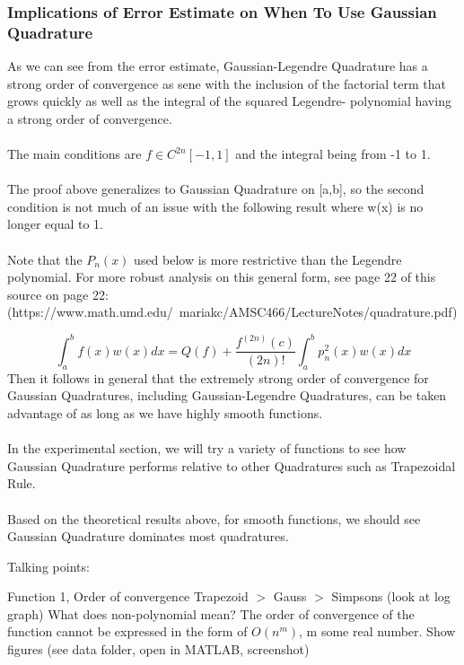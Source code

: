 \documentclass[12pt]{article}
\begin{document}
\subsubsection{Implications of Error Estimate on When To Use Gaussian Quadrature}
As we can see from the error estimate, Gaussian-Legendre Quadrature has a strong order of convergence as sene with the inclusion of the factorial term that grows quickly as well as the integral of the squared Legendre- polynomial having a strong order of convergence. 
\\
\\
The main conditions are $f \in C^{2n}[-1,1]$ and the integral being from -1 to 1.
\\
\\
The proof above generalizes to Gaussian Quadrature on [a,b], so the second condition is not much of an issue with the following result where w(x) is no longer equal to 1.
\\
\\
Note that the $P_n(x)$ used below is more restrictive than the Legendre polynomial. For more robust analysis on this general form, see page 22 of this source on page 22:
\\
(https://www.math.umd.edu/~mariakc/AMSC466/LectureNotes/quadrature.pdf)

\begin{equation}
    \int_a^b f(x)w(x)dx = Q(f) + \frac{f^{(2n)}(c)}{(2n)!} \int_a^b p_n^2(x)w(x)dx
\end{equation}
Then it follows in general that the extremely strong order of convergence for Gaussian Quadratures, including Gaussian-Legendre Quadratures, can be taken advantage of as long as we have highly smooth functions.
\\
\\
In the experimental section, we will try a variety of functions to see how Gaussian Quadrature performs relative to other Quadratures such as Trapezoidal Rule.
\\
\\
Based on the theoretical results above, for smooth functions, we should see Gaussian Quadrature dominates most quadratures.








Talking points:

Function 1, Order of convergence Trapezoid $>$ Gauss $>$ Simpsons (look at log graph)
What does non-polynomial mean? The order of convergence of the function cannot be
expressed in the form of $O(n^m)$, m some real number. Show figures (see data folder,
open in MATLAB, screenshot)
\end{document}
